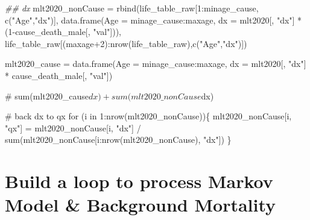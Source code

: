 \documentclass[
  letterpaper,
  DIV=11,
  numbers=noendperiod]{scrartcl}
\newenvironment{Shaded}{\begin{snugshade}}{\end{snugshade}}
\newcommand{\AttributeTok}[1]{\textcolor[rgb]{0.40,0.45,0.13}{#1}}
\newcommand{\CommentTok}[1]{\textcolor[rgb]{0.37,0.37,0.37}{#1}}
\newcommand{\ControlFlowTok}[1]{\textcolor[rgb]{0.00,0.23,0.31}{#1}}
\newcommand{\DecValTok}[1]{\textcolor[rgb]{0.68,0.00,0.00}{#1}}
\newcommand{\DocumentationTok}[1]{\textcolor[rgb]{0.37,0.37,0.37}{\textit{#1}}}
\newcommand{\FunctionTok}[1]{\textcolor[rgb]{0.28,0.35,0.67}{#1}}
\newcommand{\NormalTok}[1]{\textcolor[rgb]{0.00,0.23,0.31}{#1}}
\newcommand{\OtherTok}[1]{\textcolor[rgb]{0.00,0.23,0.31}{#1}}
\newcommand{\SpecialCharTok}[1]{\textcolor[rgb]{0.37,0.37,0.37}{#1}}
\newcommand{\StringTok}[1]{\textcolor[rgb]{0.13,0.47,0.30}{#1}}
\begin{document}
\begin{Shaded}
\begin{Highlighting}[]
\DocumentationTok{\#\# dx}
\NormalTok{mlt2020\_nonCause }\OtherTok{=} \FunctionTok{rbind}\NormalTok{(life\_table\_raw[}\DecValTok{1}\SpecialCharTok{:}\NormalTok{minage\_cause, }\FunctionTok{c}\NormalTok{(}\StringTok{"Age"}\NormalTok{,}\StringTok{"dx"}\NormalTok{)],}
                         \FunctionTok{data.frame}\NormalTok{(}\AttributeTok{Age =}\NormalTok{ minage\_cause}\SpecialCharTok{:}\NormalTok{maxage, }
                                    \AttributeTok{dx =}\NormalTok{ mlt2020[, }\StringTok{"dx"}\NormalTok{] }\SpecialCharTok{*}\NormalTok{ (}\DecValTok{1}\SpecialCharTok{{-}}\NormalTok{cause\_death\_male[, }\StringTok{"val"}\NormalTok{])),}
\NormalTok{                         life\_table\_raw[(maxage}\SpecialCharTok{+}\DecValTok{2}\NormalTok{)}\SpecialCharTok{:}\FunctionTok{nrow}\NormalTok{(life\_table\_raw),}\FunctionTok{c}\NormalTok{(}\StringTok{"Age"}\NormalTok{,}\StringTok{"dx"}\NormalTok{)])}

\NormalTok{mlt2020\_cause }\OtherTok{=} \FunctionTok{data.frame}\NormalTok{(}\AttributeTok{Age =}\NormalTok{ minage\_cause}\SpecialCharTok{:}\NormalTok{maxage,}
                         \AttributeTok{dx =}\NormalTok{ mlt2020[, }\StringTok{"dx"}\NormalTok{] }\SpecialCharTok{*}\NormalTok{ cause\_death\_male[, }\StringTok{"val"}\NormalTok{])}

\CommentTok{\# sum(mlt2020\_cause$dx) + sum(mlt2020\_nonCause$dx)}

\CommentTok{\# back dx to qx}
\ControlFlowTok{for}\NormalTok{ (i }\ControlFlowTok{in} \DecValTok{1}\SpecialCharTok{:}\FunctionTok{nrow}\NormalTok{(mlt2020\_nonCause))\{}
\NormalTok{  mlt2020\_nonCause[i, }\StringTok{"qx"}\NormalTok{] }\OtherTok{=}\NormalTok{ mlt2020\_nonCause[i, }\StringTok{"dx"}\NormalTok{] }\SpecialCharTok{/} \FunctionTok{sum}\NormalTok{(mlt2020\_nonCause[i}\SpecialCharTok{:}\FunctionTok{nrow}\NormalTok{(mlt2020\_nonCause), }\StringTok{"dx"}\NormalTok{])}
\NormalTok{\}}
\end{Highlighting}
\end{Shaded}

\hypertarget{build-a-loop-to-process-markov-model-background-mortality}{%
\section{Build a loop to process Markov Model \& Background
Mortality}\label{build-a-loop-to-process-markov-model-background-mortality}}
\end{document}
